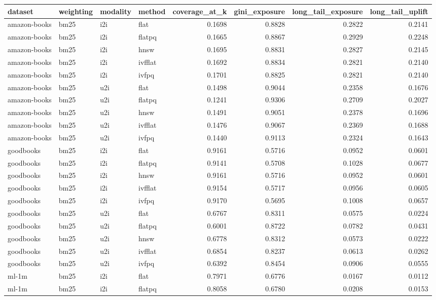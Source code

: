 \begin{tabular}{llllrrrr}
\toprule
dataset & weighting & modality & method & coverage_at_k & gini_exposure & long_tail_exposure & long_tail_uplift \\
\midrule
amazon-books & bm25 & i2i & flat & 0.1698 & 0.8828 & 0.2822 & 0.2141 \\
amazon-books & bm25 & i2i & flatpq & 0.1665 & 0.8867 & 0.2929 & 0.2248 \\
amazon-books & bm25 & i2i & hnsw & 0.1695 & 0.8831 & 0.2827 & 0.2145 \\
amazon-books & bm25 & i2i & ivfflat & 0.1692 & 0.8834 & 0.2821 & 0.2140 \\
amazon-books & bm25 & i2i & ivfpq & 0.1701 & 0.8825 & 0.2821 & 0.2140 \\
amazon-books & bm25 & u2i & flat & 0.1498 & 0.9044 & 0.2358 & 0.1676 \\
amazon-books & bm25 & u2i & flatpq & 0.1241 & 0.9306 & 0.2709 & 0.2027 \\
amazon-books & bm25 & u2i & hnsw & 0.1491 & 0.9051 & 0.2378 & 0.1696 \\
amazon-books & bm25 & u2i & ivfflat & 0.1476 & 0.9067 & 0.2369 & 0.1688 \\
amazon-books & bm25 & u2i & ivfpq & 0.1440 & 0.9113 & 0.2324 & 0.1643 \\
goodbooks & bm25 & i2i & flat & 0.9161 & 0.5716 & 0.0952 & 0.0601 \\
goodbooks & bm25 & i2i & flatpq & 0.9141 & 0.5708 & 0.1028 & 0.0677 \\
goodbooks & bm25 & i2i & hnsw & 0.9161 & 0.5716 & 0.0952 & 0.0601 \\
goodbooks & bm25 & i2i & ivfflat & 0.9154 & 0.5717 & 0.0956 & 0.0605 \\
goodbooks & bm25 & i2i & ivfpq & 0.9170 & 0.5695 & 0.1008 & 0.0657 \\
goodbooks & bm25 & u2i & flat & 0.6767 & 0.8311 & 0.0575 & 0.0224 \\
goodbooks & bm25 & u2i & flatpq & 0.6001 & 0.8722 & 0.0782 & 0.0431 \\
goodbooks & bm25 & u2i & hnsw & 0.6778 & 0.8312 & 0.0573 & 0.0222 \\
goodbooks & bm25 & u2i & ivfflat & 0.6854 & 0.8237 & 0.0613 & 0.0262 \\
goodbooks & bm25 & u2i & ivfpq & 0.6392 & 0.8454 & 0.0906 & 0.0555 \\
ml-1m & bm25 & i2i & flat & 0.7971 & 0.6776 & 0.0167 & 0.0112 \\
ml-1m & bm25 & i2i & flatpq & 0.8058 & 0.6780 & 0.0208 & 0.0153 \\

\end{tabular}
